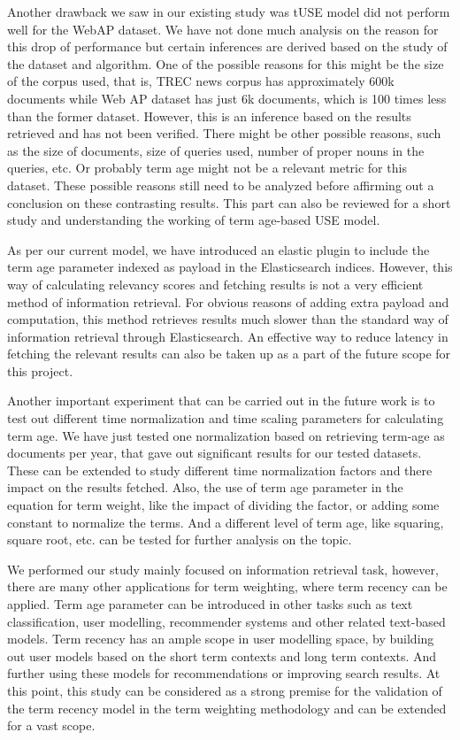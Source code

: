 Another drawback we saw in our existing study was tUSE model did not perform well for the WebAP dataset. We have not done much analysis on the reason for this drop of performance but certain inferences are derived based on the study of the dataset and algorithm. One of the possible reasons for this might be the size of the corpus used, that is, TREC news corpus has approximately 600k documents while Web AP dataset has just 6k documents, which is 100 times less than the former dataset. However, this is an inference based on the results retrieved and has not been verified. There might be other possible reasons, such as the size of documents, size of queries used, number of proper nouns in the queries, etc. Or probably term age might not be a relevant metric for this dataset. These possible reasons still need to be analyzed before affirming out a conclusion on these contrasting results. This part can also be reviewed for a short study and understanding the working of term age-based USE model.

As per our current model, we have introduced an elastic plugin to include the term age parameter indexed as payload in the Elasticsearch indices. However, this way of calculating relevancy scores and fetching results is not a very efficient method of information retrieval. For obvious reasons of adding extra payload and computation, this method retrieves results much slower than the standard way of information retrieval through Elasticsearch. An effective way to reduce latency in fetching the relevant results can also be taken up as a part of the future scope for this project.


Another important experiment that can be carried out in the future work is to test out different time normalization and time scaling parameters for calculating term age. We have just tested one normalization based on retrieving term-age as documents per year, that gave out significant results for our tested datasets. These can be extended to study different time normalization factors and there impact on the results fetched. Also, the use of term age parameter in the equation for term weight, like the impact of dividing the factor, or adding some constant to normalize the terms. And a different level of term age, like squaring, square root, etc. can be tested for further analysis on the topic.


We performed our study mainly focused on information retrieval task, however, there are many other applications for term weighting, where term recency can be applied. Term age parameter can be introduced in other tasks such as text classification, user modelling, recommender systems and other related text-based models. Term recency has an ample scope in user modelling space, by building out user models based on the short term contexts and long term contexts. And further using these models for recommendations or improving search results. At this point, this study can be considered as a strong premise for the validation of the term recency model in the term weighting methodology and can be extended for a vast scope.


